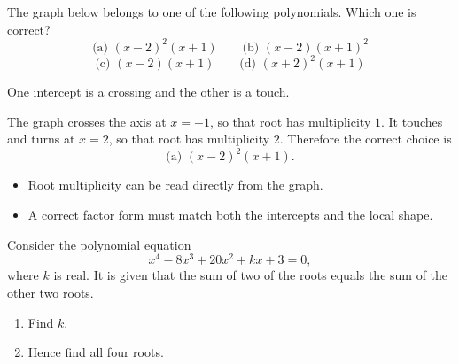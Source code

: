 \begin{problem}
The graph below belongs to one of the following polynomials. Which one is correct?
\[
\text{(a) }(x-2)^2(x+1)\qquad
\text{(b) }(x-2)(x+1)^2
\]
\[
\text{(c) }(x-2)(x+1)\qquad
\text{(d) }(x+2)^2(x+1)
\]

\begin{center}
\end{center}
\end{problem}

\begin{hintbox}
One intercept is a crossing and the other is a touch.
\end{hintbox}

\begin{solution}
The graph crosses the axis at $x=-1$, so that root has multiplicity $1$.
It touches and turns at $x=2$, so that root has multiplicity $2$.
Therefore the correct choice is
\[
\boxed{\text{(a) }(x-2)^2(x+1).}
\]
\end{solution}

\begin{takeaways}
\begin{itemize}[leftmargin=*]
\item Root multiplicity can be read directly from the graph.
\item A correct factor form must match both the intercepts and the local shape.
\end{itemize}
\end{takeaways}

\begin{problem}
Consider the polynomial equation
\[
x^4-8x^3+20x^2+kx+3=0,
\]
where $k$ is real. It is given that the sum of two of the roots equals the sum of the other two roots.
\begin{enumerate}[label=(\roman*)]
\item Find $k$.
\item Hence find all four roots.
\end{enumerate}
\end{problem}

